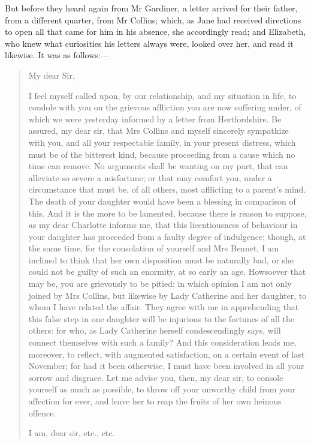 But before they heard again from Mr Gardiner, a letter arrived for their father, from a different quarter, from Mr Collins; which, as Jane had received directions to open all that came for him in his absence, she accordingly read; and Elizabeth, who knew what curiosities his letters always were, looked over her, and read it likewise. It was as follows:—

\begin{quotation}

\noindent My dear Sir,

\indent I feel myself called upon, by our relationship, and my situation in life, to condole with you on the grievous affliction you are now suffering under, of which we were yesterday informed by a letter from Hertfordshire. Be assured, my dear sir, that Mrs Collins and myself sincerely sympathize with you, and all your respectable family, in your present distress, which must be of the bitterest kind, because proceeding from a cause which no time can remove. No arguments shall be wanting on my part, that can alleviate so severe a misfortune; or that may comfort you, under a circumstance that must be, of all others, most afflicting to a parent's mind. The death of your daughter would have been a blessing in comparison of this. And it is the more to be lamented, because there is reason to suppose, as my dear Charlotte informs me, that this licentiousness of behaviour in your daughter has proceeded from a faulty degree of indulgence; though, at the same time, for the consolation of yourself and Mrs Bennet, I am inclined to think that her own disposition must be naturally bad, or she could not be guilty of such an enormity, at so early an age. Howsoever that may be, you are grievously to be pitied; in which opinion I am not only joined by Mrs Collins, but likewise by Lady Catherine and her daughter, to whom I have related the affair. They agree with me in apprehending that this false step in one daughter will be injurious to the fortunes of all the others: for who, as Lady Catherine herself condescendingly says, will connect themselves with such a family? And this consideration leads me, moreover, to reflect, with augmented satisfaction, on a certain event of last November; for had it been otherwise, I must have been involved in all your sorrow and disgrace. Let me advise you, then, my dear sir, to console yourself as much as possible, to throw off your unworthy child from your affection for ever, and leave her to reap the fruits of her own heinous offence.\\

\begin{flushright}
I am, dear sir, etc., etc.
\end{flushright}
\end{quotation}

